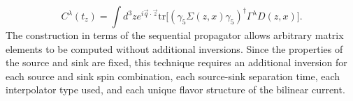 \documentclass[prd,12pt,superscriptaddress,tightenlines,nofootinbib]{revtex4}
\DeclareMathOperator{\tr}{tr}
\def\mc#1{{\mathcal #1}}
\def\a{{\alpha}}
\def\b{{\beta}}
\def\g{{\gamma}}
\def\G{{\Gamma}}
\def\l{{\lambda}}
\def\ip{{i^\prime}}
\def\jp{{j^\prime}}
\def\kp{{k^\prime}}
\def\ap{{\alpha^\prime}}
\def\bp{{\beta^\prime}}
\def\gp{{\gamma^\prime}}
\def\rp{{\rho^\prime}}
\def\tr{\text{tr}}
\def\eqref#1{{(\ref{#1})}}
\begin{document}
\begin{equation}
C^\l (t_z) = \int d^3 z  e^{i \vec{q} \cdot \vec{z}} \tr\Big[ \left( \gamma_{5} \Sigma(z,x) \gamma_{5}\right)^{\dagger} \G^\l D(z,x) \Big].
\end{equation}
The construction in terms of the sequential propagator allows arbitrary matrix elements to be computed without additional inversions. Since the properties of the source and sink are fixed, this technique requires an additional inversion for each source and sink spin combination, each source-sink separation time, each interpolator type used, and each unique flavor structure of the bilinear current.





%
%
%
\end{document}
